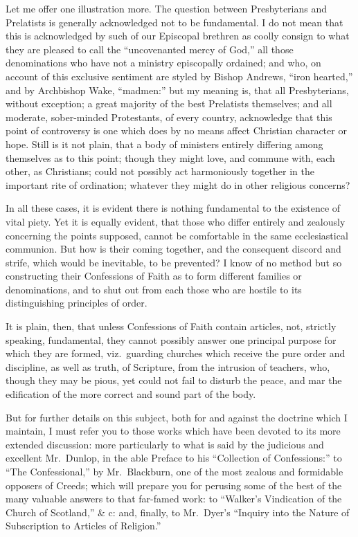 \documentclass[
]{book}
\begin{document}
Let me offer one illustration more. The question between Presbyterians and Prelatists is generally acknowledged not to be fundamental. I do not mean that this is acknowledged by such of our Episcopal brethren as coolly consign to what they are pleased to call the ``uncovenanted mercy of God,'' all those denominations who have not a ministry episcopally ordained; and who, on account of this exclusive sentiment are styled by Bishop Andrews, ``iron hearted,'' and by Archbishop Wake, ``madmen:'' but my meaning is, that all Presbyterians, without exception; a great majority of the best Prelatists themselves; and all moderate, sober-minded Protestants, of every country, acknowledge that this point of controversy is one which does by no means affect Christian character or hope. Still is it not plain, that a body of ministers entirely differing among themselves as to this point; though they might love, and commune with, each other, as Christians; could not possibly act harmoniously together in the important rite of ordination; whatever they might do in other religious concerns?

In all these cases, it is evident there is nothing fundamental to the existence of vital piety. Yet it is equally evident, that those who differ entirely and zealously concerning the points supposed, cannot be comfortable in the same ecclesiastical communion. But how is their coming together, and the consequent discord and strife, which would be inevitable, to be prevented? I know of no method but so constructing their Confessions of Faith as to form different families or denominations, and to shut out from each those who are hostile to its distinguishing principles of order.

It is plain, then, that unless Confessions of Faith contain articles, not, strictly speaking, fundamental, they cannot possibly answer one principal purpose for which they are formed, viz.~guarding churches which receive the pure order and discipline, as well as truth, of Scripture, from the intrusion of teachers, who, though they may be pious, yet could not fail to disturb the peace, and mar the edification of the more correct and sound part of the body.

But for further details on this subject, both for and against the doctrine which I maintain, I must refer you to those works which have been devoted to its more extended discussion: more particularly to what is said by the judicious and excellent Mr.~Dunlop, in the able Preface to his ``Collection of Confessions:'' to ``The Confessional,'' by Mr.~Blackburn, one of the most zealous and formidable opposers of Creeds; which will prepare you for perusing some of the best of the many valuable answers to that far-famed work: to ``Walker's Vindication of the Church of Scotland,'' \& c: and, finally, to Mr.~Dyer's ``Inquiry into the Nature of Subscription to Articles of Religion.''
\end{document}
